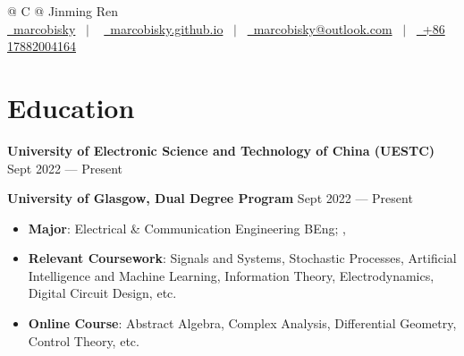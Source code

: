 \documentclass[a4paper,11pt]{article}
\newcommand{\MYhref}[3][black]{\href{#2}{\color{#1}{#3}}}%
\begin{document}
\pagestyle{empty} 



\begin{tabularx}{\linewidth}{@{} C @{}}
\Huge{Jinming Ren} \\[7.5pt]
\href{https://github.com/marcobisky}{\raisebox{-0.05\height}\faGithub\ marcobisky} \ $|$ \ 
\href{https://marcobisky.github.io}{\raisebox{-0.05\height}\faGlobe \ marcobisky.github.io} \ $|$ \ 
\href{mailto:marcobisky@outlook.com}{\raisebox{-0.05\height}\faEnvelope \ marcobisky@outlook.com} \ $|$ \ 
\href{tel:+86 17882004164}{\raisebox{-0.05\height}\faMobile \ +86 17882004164} \\
\end{tabularx}


\section{Education}


\textbf{University of Electronic Science and Technology of China (UESTC)}  \hfill Sept 2022 --- Present

\textbf{University of Glasgow, Dual Degree Program} \hfill Sept 2022 --- Present

\begin{itemize}
    \setlength\itemsep{-0.5em}
    \item \textbf{Major}: Electrical \& Communication Engineering BEng; \MYhref{https://marcobisky.github.io/cv/score.pdf}{GPA: 3.87/4.0}, \MYhref{https://marcobisky.github.io/cv/rank.pdf}{Ranking: 2/164 (Top 1.2\%).} 
    \item \textbf{Relevant Coursework}: Signals and Systems, Stochastic Processes, Artificial Intelligence and Machine Learning, Information Theory, Electrodynamics, Digital Circuit Design, etc.
    \item \textbf{Online Course}: Abstract Algebra, Complex Analysis, Differential Geometry, Control Theory, etc.
\end{itemize}
\end{document}
